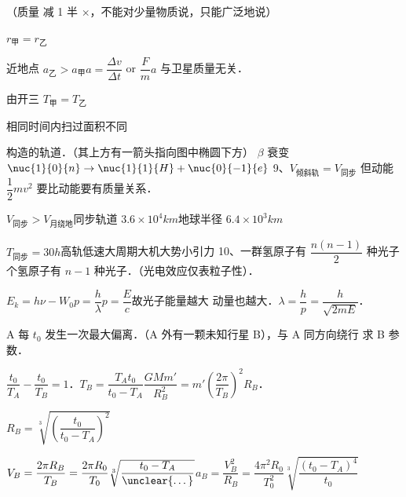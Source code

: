 \quad {}

（质量  减 1 半 $\times$，不能对少量物质说，只能广泛地说）

$r_{\text{甲}}=r_{\text{乙}}$%

近地点 $a_{\text{乙}}>a_{\text{甲}}$\quad\quad $a=\dfrac{\Delta v}{\Delta t}$ or $\dfrac Fm$\quad $a$ 与卫星质量无关．

由开三 $T_{\text{甲}}=T_{\text{乙}}$

相同时间内扫过面积不同

构造的轨道．（其上方有一箭头指向图中椭圆下方）
$\beta$ 衰变\quad $\nuc{1}{0}{n}\to\nuc{1}{1}{H}+\nuc{0}{-1}{e}$
9、$V_{\text{倾斜轨}}=V_{\text{同步}}$ 但动能 $\dfrac12mv^2$ 要比动能要有质量关系．%

$V_{\text{同步}}>V_{\text{月绕地}}$\quad 同步轨道 $3.6\times10^4\unit{km}$\quad 地球半径 $6.4\times10^3\unit{km}$

$T_{\text{同步}}=30\unit{h}$\quad 高轨低速大周期大机大势小引力%
10、一群氢原子有 $\dfrac{n(n-1)}{2}$ 种光子 个氢原子有 $n-1$ 种光子．（光电效应仅表粒子性）．

$E_k=h\nu-W_0$\quad $p=\dfrac h\lambda$\quad $p=\dfrac Ec$\quad 故光子能量越大 动量也越大．\quad $\lambda=\dfrac hp=\dfrac{h}{\sqrt{2mE}}$．
\begin{problem}[11]
A 每 $t_0$ 发生一次最大偏离．（A 外有一颗未知行星 B），与 A 同方向绕行 求 B 参数．


\begin{solution}
$\dfrac{t_0}{T_A}-\dfrac{t_0}{T_B}=1$．\quad $T_B=\dfrac{T_At_0}{t_0-T_A}$\quad $\dfrac{GMm'}{R_B^{2}}=m'\left(\dfrac{2\pi}{T_B}\right)^{2}R_B$．

$R_B=\sqrt[3]{\left(\dfrac{t_0}{t_0-T_A}\right)^{2}}$%

$V_B=\dfrac{2\pi R_B}{T_B}=\dfrac{2\pi R_0}{T_0}\sqrt[3]{\dfrac{t_0-T_A}{\text{\unclear{…}}}}$\quad $a_B=\dfrac{V_B^{2}}{R_B}=\dfrac{4\pi^{2}R_0}{T_0^{2}}\sqrt[3]{\dfrac{(t_0-T_A)^{4}}{t_0}}$%
\end{solution}
\end{problem}
